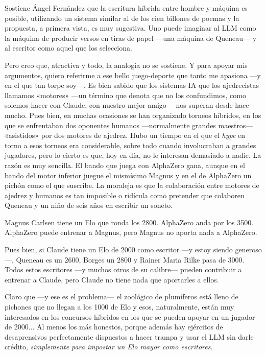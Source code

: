 \documentclass[11pt,a4paper]{article}
\begin{document}
Sostiene Ángel Fernández que la escritura híbrida entre hombre y máquina es posible, utilizando un sistema similar al de los cien billones de poemas y la propuesta, a primera vista, es muy sugestiva. Uno puede imaginar al LLM como la máquina de producir versos en tiras de papel ---una máquina de Queneau--- y al escritor como aquel que los selecciona. 

Pero creo que, atractiva y todo, la analogía no se sostiene. Y para apoyar mis argumentos, quiero referirme a ese bello juego-deporte que tanto me apasiona ---y en el que tan torpe soy---. Es bien sabido que los sistemas IA que los ajedrecistas llamamos «motores» ---un término que denota que no los confundimos, como solemos hacer con Claude, con nuestro mejor amigo--- nos superan desde hace mucho. Pues bien, en muchas ocasiones se han organizado torneos híbridos, en los que se enfrentaban dos oponentes humanos ---normalmente grandes maestros--- «asistidos» por dos motores de ajedrez. Hubo un tiempo en el que el \emph{hype} en torno a esos torneos era considerable, sobre todo cuando involucraban a grandes jugadores, pero lo cierto es que, hoy en día, no le interesan demasiado a nadie. La razón es muy sencilla. El bando que juega con AlphaZero gana, aunque en el bando del motor inferior juegue el mismísimo Magnus y en el de AlphaZero un pichón como el que suscribe. La moraleja es que la colaboración entre motores de ajedrez y humanos es tan imposible o ridícula como pretender que colaboren Queneau y un niño de seis años en escribir un soneto. 

Magnus Carlsen tiene un Elo que ronda los 2800. AlphaZero anda por los 3500. AlphaZero puede entrenar a Magnus, pero Magnus no aporta nada a AlphaZero.

Pues bien, si Claude tiene un Elo de 2000 como escritor ---y estoy siendo generoso---, Queneau es un 2600, Borges un 2800 y Rainer Maria Rilke pasa de 3000. Todos estos escritores ---y muchos otros de su calibre--- pueden contribuir a entrenar a Claude, pero Claude no tiene nada que aportarles a ellos. 

Claro que ---y ese es el problema--- el zoológico de plumíferos está lleno de pichones que no llegan a los 1000 de Elo y esos, naturalmente, están muy interesados en los concursos híbridos en los que se pueden apoyar en un jugador de 2000... Al menos los más honestos, porque además hay ejércitos de desaprensivos perfectamente dispuestos a hacer trampa y usar el LLM sin darle crédito, \emph{simplemente para impostar un Elo mayor como escritores}. 
\end{document}
